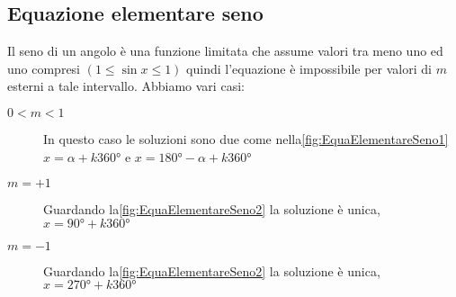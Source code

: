 \subsection{Equazione elementare seno}
\begin{figure}
	\begin{subfigure}[b]{.5\linewidth}
		\centering
		
		\label{fig:EquaElementareSeno4}
	\end{subfigure}%
	\begin{subfigure}[b]{.5\linewidth}
		\centering
		
		\label{fig:EquaElementareCoseno4}
	\end{subfigure}
	\label{fig:EquaElementareSenoCoseno2}
\end{figure}
Il seno di un angolo è una funzione limitata che assume valori  tra meno uno ed uno compresi $(1\leq\sin x\leq 1)$ quindi l'equazione è impossibile per valori di $m$ esterni a tale intervallo. Abbiamo vari casi:
\begin{description}
	\item[$0<m<1$] In questo caso le soluzioni sono due come nella\nobs\vref{fig:EquaElementareSeno1} $x=\alpha+k\ang{360}$ e $x=\ang{180}-\alpha+k\ang{360}$
	\item [$m=+1$] Guardando la\nobs\vref{fig:EquaElementareSeno2} la soluzione è unica, $x=\ang{90}+k\ang{360}$
	\item [$m=-1$] Guardando la\nobs\vref{fig:EquaElementareSeno2} la soluzione è unica, $x=\ang{270}+k\ang{360}$
\end{description} 
\begin{figure}
	\begin{subfigure}[b]{.5\linewidth}
		\centering
			
			\label{fig:EquaElementareSeno1}
	\end{subfigure}%
	\begin{subfigure}[b]{.5\linewidth}
		\centering
		
		\label{fig:EquaElementareCoseno1}
	\end{subfigure}
	\label{fig:EquaElementareSenoCoseno}
\end{figure}
